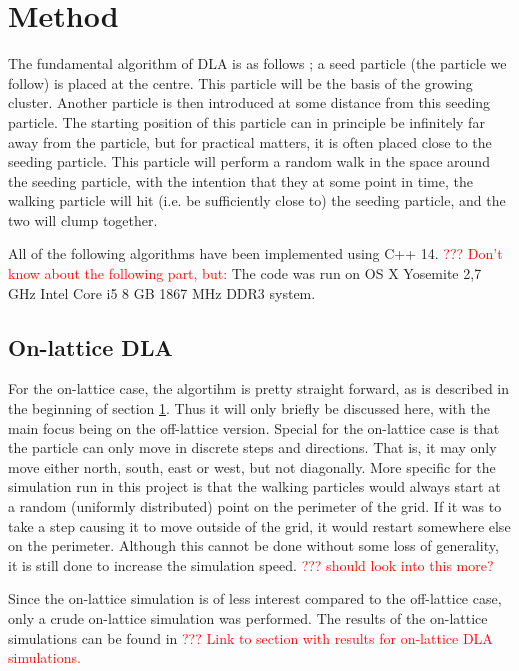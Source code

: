 \section{Method}
\label{sec:method}
The fundamental algorithm of DLA is as follows \cite{PhysRevLett.47.1400}; a seed particle (the particle we follow) is placed at the centre. This particle will be the basis of the growing cluster. Another particle is then introduced at some distance from this seeding particle. The starting position of this particle can in principle be infinitely far away from the particle, but for practical matters, it is often placed close to the seeding particle. This particle will perform a random walk in the space around the seeding particle, with the intention that they at some point in time, the walking particle will hit (i.e. be sufficiently close to) the seeding particle, and the two will clump together. 

All of the following algorithms have been implemented using C++ 14. \textcolor{red}{??? Don't know about the following part, but:} The code was run on OS X Yosemite 2,7 GHz Intel Core i5 8 GB 1867 MHz DDR3 system.

\subsection{On-lattice DLA}
\label{sec:on-lattice_method}
For the on-lattice case, the algortihm is pretty straight forward, as is described in the beginning of section \ref{sec:method}. Thus it will only briefly be discussed here, with the main focus being on the off-lattice version. Special for the on-lattice case is that the particle can only move in discrete steps and directions. That is, it may only move either north, south, east or west, but not diagonally. More specific for the simulation run in this project is that the walking particles would always start at a random (uniformly distributed) point on the perimeter of the grid. If it was to take a step causing it to move outside of the grid, it would restart somewhere else on the perimeter. Although this cannot be done without some loss of generality, it is still done to increase the simulation speed. \textcolor{red}{??? should look into this more?}

Since the on-lattice simulation is of less interest compared to the off-lattice case, only a crude on-lattice simulation was performed. The results of the on-lattice simulations can be found in \textcolor{red}{??? Link to section with results for on-lattice DLA simulations. }

